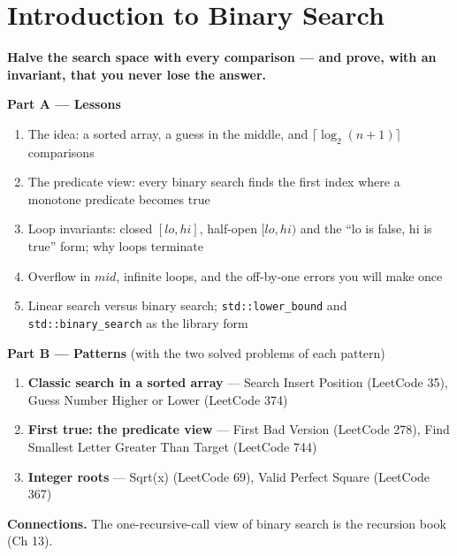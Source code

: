 \chapter{Introduction to Binary Search}
\label{ch:introduction}

\begin{tcolorbox}[enhanced, colback=white, colframe=secondaryblue, boxrule=1pt, arc=2mm]
\textbf{\large\textcolor{primaryblue}{Halve the search space with every comparison --- and prove, with an invariant, that you never lose the answer.}}
\end{tcolorbox}


\begin{plannedbox}
\textbf{Part A --- Lessons}
\begin{enumerate}[leftmargin=*, label=\textbf{A\arabic*.}, itemsep=1pt]
    \item The idea: a sorted array, a guess in the middle, and $\lceil \log_2(n+1) \rceil$ comparisons
    \item The predicate view: every binary search finds the first index where a monotone predicate becomes true
    \item Loop invariants: closed $[lo, hi]$, half-open $[lo, hi)$ and the ``lo is false, hi is true'' form; why loops terminate
    \item Overflow in $mid$, infinite loops, and the off-by-one errors you will make once
    \item Linear search versus binary search; \texttt{std::lower\_bound} and \texttt{std::binary\_search} as the library form
\end{enumerate}
\textbf{Part B --- Patterns} (with the two solved problems of each pattern)
\begin{enumerate}[leftmargin=*, label=\textbf{P\arabic*.}, itemsep=1pt]
    \item \textbf{Classic search in a sorted array} --- Search Insert Position {\small\color{darkgray}(LeetCode 35)}, Guess Number Higher or Lower {\small\color{darkgray}(LeetCode 374)}
    \item \textbf{First true: the predicate view} --- First Bad Version {\small\color{darkgray}(LeetCode 278)}, Find Smallest Letter Greater Than Target {\small\color{darkgray}(LeetCode 744)}
    \item \textbf{Integer roots} --- Sqrt(x) {\small\color{darkgray}(LeetCode 69)}, Valid Perfect Square {\small\color{darkgray}(LeetCode 367)}
\end{enumerate}
\textbf{Connections.} The one-recursive-call view of binary search is the recursion book (Ch 13).
\end{plannedbox}
